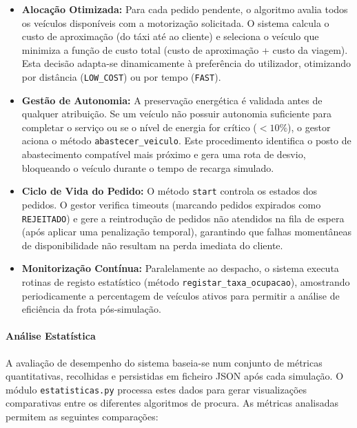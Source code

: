 \documentclass[11pt, a4paper, fleqn]{article}
\begin{document}
	\begin{itemize}
		\item \textbf{Alocação Otimizada:} Para cada pedido pendente, o algoritmo avalia todos os veículos disponíveis com a motorização solicitada. O sistema calcula o custo de aproximação (do táxi até ao cliente) e seleciona o veículo que minimiza a função de custo total (custo de aproximação + custo da viagem). Esta decisão adapta-se dinamicamente à preferência do utilizador, otimizando por distância (\texttt{LOW\_COST}) ou por tempo (\texttt{FAST}).
		
		\item \textbf{Gestão de Autonomia:} A preservação energética é validada antes de qualquer atribuição. Se um veículo não possuir autonomia suficiente para completar o serviço ou se o nível de energia for crítico ($<10\%$), o gestor aciona o método \texttt{abastecer\_veiculo}. Este procedimento identifica o posto de abastecimento compatível mais próximo e gera uma rota de desvio, bloqueando o veículo durante o tempo de recarga simulado.
		
		\item \textbf{Ciclo de Vida do Pedido:} O método \texttt{start} controla os estados dos pedidos. O gestor verifica timeouts (marcando pedidos expirados como \texttt{REJEITADO}) e gere a reintrodução de pedidos não atendidos na fila de espera (após aplicar uma penalização temporal), garantindo que falhas momentâneas de disponibilidade não resultam na perda imediata do cliente.
		
		\item \textbf{Monitorização Contínua:} Paralelamente ao despacho, o sistema executa rotinas de registo estatístico (método \texttt{registar\_taxa\_ocupacao}), amostrando periodicamente a percentagem de veículos ativos para permitir a análise de eficiência da frota pós-simulação.
	\end{itemize}
	
	\paragraph{Análise Estatística}
	A avaliação de desempenho do sistema baseia-se num conjunto de métricas quantitativas, recolhidas e persistidas em ficheiro JSON após cada simulação. O módulo \texttt{estatisticas.py} processa estes dados para gerar visualizações comparativas entre os diferentes algoritmos de procura. As métricas analisadas permitem as seguintes comparações:
	
\end{document}
